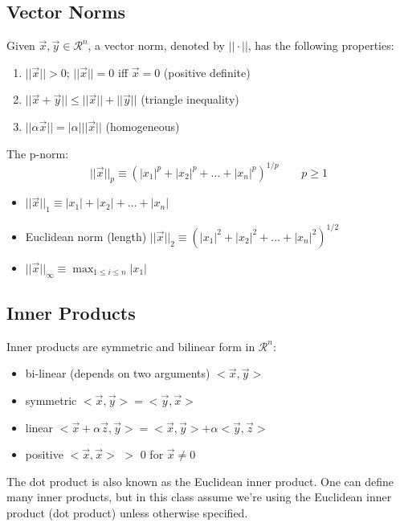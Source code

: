 \documentclass[12pt]{article}
\begin{document}
\subsection{Vector Norms}
Given $\vec{x}, \vec{y} \in \mathcal{R}^n$, a vector norm, denoted by $|| \cdot ||$, has the following properties:
%
\begin{enumerate}
\item $||\vec{x}|| > 0$; $||\vec{x}|| = 0$ iff $\vec{x} = 0$ (positive definite)
\item $||\vec{x} + \vec{y}|| \leq ||\vec{x}|| + ||\vec{y}||$ (triangle inequality)
\item $||\alpha \vec{x}|| = |\alpha| ||\vec{x}||$ (homogeneous)
\end{enumerate}

The p-norm:
%
\begin{equation}
||\vec{x}||_p \equiv (|x_1|^p + |x_2|^p + \dots + |x_n|^p)^{1/p} \qquad p \geq 1 \nonumber
\end{equation}
%
\begin{itemize}
\item $||\vec{x}||_1 \equiv |x_1| + |x_2| + \dots + |x_n|$
\item Euclidean norm (length) $||\vec{x}||_2 \equiv (|x_1|^2 + |x_2|^2 + \dots + |x_n|^2)^{1/2}$
\item $||\vec{x}||_{\infty} \equiv \displaystyle \max_{1 \leq i \leq n} |x_1|$
\end{itemize}

\subsection{Inner Products}
Inner products are symmetric and bilinear form in $\mathcal{R}^n$:
%
\begin{itemize}
\item bi-linear (depends on two arguments) $< \vec{x}, \vec{y} >$
\item symmetric $< \vec{x}, \vec{y} > = < \vec{y}, \vec{x} >$
\item linear $< \vec{x} + \alpha \vec{z}, \vec{y} > = < \vec{x}, \vec{y} > + \alpha < \vec{y}, \vec{z} >$
\item positive $< \vec{x}, \vec{x} >$ $>$ 0 for $\vec{x} \neq 0$
\end{itemize}

The dot product is also known as the Euclidean inner product. One can define many inner products, but in this class assume we're using the Euclidean inner product (dot product) unless otherwise specified. 
\end{document}
